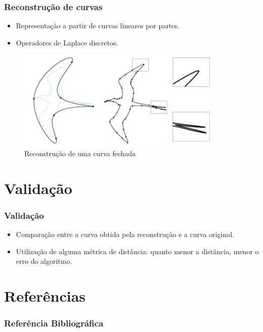 \documentclass{beamer}
\begin{document}
    \begin{frame}
      \frametitle{Reconstrução de curvas}
    
        \begin{itemize}
          \item Representação a partir de curvas lineares por partes.
          \bigskip
          \item Operadores de Laplace discretos.
        \end{itemize}
        
        \begin{figure}[hbt]
            \begin{center}
            \caption{Reconstrução de uma curva fechada~\cite{book_sorkine}}
            \includegraphics[width=.6\textwidth]{./img/reconstrucao.png}
            \end{center}
          \end{figure}
    \end{frame}
    
    \section{Validação}
    
    \begin{frame}
      \frametitle{Validação}
    
        \begin{itemize}
          \item Comparação entre a curva obtida pela reconstrução e a curva original.
          \bigskip
          \item Utilização de alguma métrica de distância: quanto menor a distância, menor o erro do algoritmo.
        \end{itemize}
    \end{frame}
    
    \section{Referências}
    
    \begin{frame}[allowframebreaks]
      \frametitle{Referência Bibliográfica}
      
      
      
    \end{frame}
\end{document}
